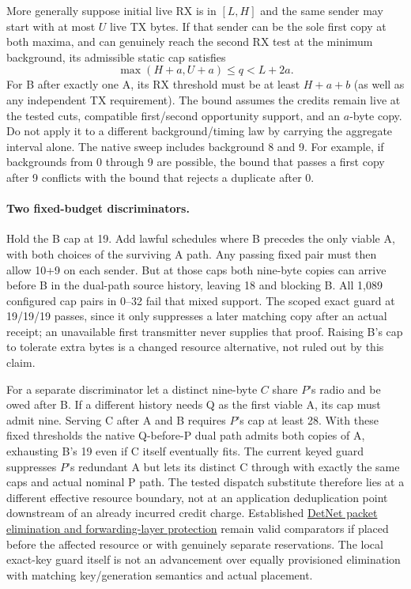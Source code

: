 \documentclass{article}
\begin{document}
More generally suppose initial live RX is in $[L,H]$ and the
same sender may start with at most $U$ live TX bytes. If that
sender can be the sole first copy at both maxima, and can
genuinely reach the second RX test at the minimum background,
its admissible static cap satisfies
\[
                 \max(H+a,U+a)\le q<L+2a.
\]
For B after exactly one A, its RX threshold must be at least
$H+a+b$ (as well as any independent TX requirement). The bound
assumes the credits remain live at the tested cuts, compatible
first/second opportunity support, and an $a$-byte copy. Do not
apply it to a different background/timing law by carrying the
aggregate interval alone. The native sweep includes background
8 and 9. For example, if backgrounds from 0 through 9 are
possible, the bound that passes a first copy after 9 conflicts
with the bound that rejects a duplicate after 0.

\paragraph{Two fixed-budget discriminators.}
Hold the B cap at 19. Add lawful schedules where B precedes the
only viable A, with both choices of the surviving A path. Any
passing fixed pair must then allow 10+9 on each sender. But at
those caps both nine-byte copies can arrive before B in the
dual-path source history, leaving 18 and blocking B. All 1,089
configured cap pairs in 0--32 fail that mixed support. The
scoped exact guard at 19/19/19 passes, since it only suppresses
a later matching copy after an actual receipt; an unavailable
first transmitter never supplies that proof. Raising B's cap
to tolerate extra bytes is a changed resource alternative, not
ruled out by this claim.

For a separate discriminator let a distinct nine-byte $C$ share
$P$'s radio and be owed after B. If a different history needs Q
as the first viable A, its cap must admit nine. Serving C after
A and B requires $P$'s cap at least 28. With these fixed
thresholds the native Q-before-P dual path admits both copies
of A, exhausting B's 19 even if C itself eventually fits.
The current keyed guard suppresses $P$'s redundant A but lets
its distinct C through with exactly the same caps and actual
nominal P path. The tested dispatch substitute therefore lies
at a different effective resource boundary, not at an
application deduplication point downstream of an already incurred
credit charge. Established
\href{https://www.rfc-editor.org/rfc/rfc8938.html}{DetNet packet
elimination and forwarding-layer protection} remain valid
comparators if placed before the affected resource or with
genuinely separate reservations. The local exact-key guard itself
is not an advancement over equally provisioned elimination with
matching key/generation semantics and actual placement.
\end{document}
